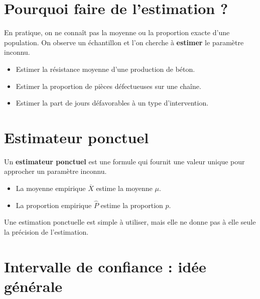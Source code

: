 
\section{Pourquoi faire de l'estimation ?}

En pratique, on ne connaît pas la moyenne ou la proportion exacte d'une population. On observe un échantillon et l'on cherche à \textbf{estimer} le paramètre inconnu.

\begin{Ex}
\begin{itemize}
    \item Estimer la résistance moyenne d'une production de béton.
    \item Estimer la proportion de pièces défectueuses sur une chaîne.
    \item Estimer la part de jours défavorables à un type d'intervention.
\end{itemize}
\end{Ex}

\section{Estimateur ponctuel}

\begin{Def}
Un \textbf{estimateur ponctuel} est une formule qui fournit une valeur unique pour approcher un paramètre inconnu.
\end{Def}

\begin{Ex}
\begin{itemize}
    \item La moyenne empirique $\overline{X}$ estime la moyenne $\mu$.
    \item La proportion empirique $\widehat{P}$ estime la proportion $p$.
\end{itemize}
\end{Ex}

\begin{Rmq}
Une estimation ponctuelle est simple à utiliser, mais elle ne donne pas à elle seule la précision de l'estimation.
\end{Rmq}

\section{Intervalle de confiance : idée générale}

